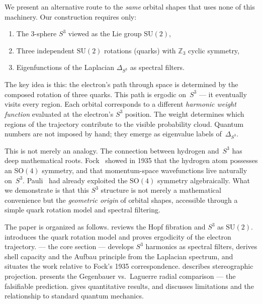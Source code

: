 \documentclass[12pt, a4paper]{article}
\theoremstyle{definition}
\theoremstyle{remark}
\newcommand{\Sthree}{S^3}
\newcommand{\SU}{\mathrm{SU}(2)}
\newcommand{\SO}{\mathrm{SO}}
\newcommand{\Z}{\mathbb{Z}}
\newcommand{\lap}{\Delta_{\Sthree}}
\begin{document}
We present an alternative route to the \emph{same} orbital shapes that uses
none of this machinery. Our construction requires only:
\begin{enumerate}[nosep]
  \item The 3-sphere $\Sthree$ viewed as the Lie group $\SU$,
  \item Three independent $\SU$ rotations (quarks) with $\Z_3$ cyclic symmetry,
  \item Eigenfunctions of the Laplacian $\lap$ as spectral filters.
\end{enumerate}

The key idea is this: the electron's path through space is determined by the
composed rotation of three quarks. This path is ergodic on~$\Sthree$ ---
it eventually visits every region. Each orbital corresponds to a different
\emph{harmonic weight function} evaluated at the electron's $\Sthree$
position. The weight determines which regions of the trajectory contribute
to the visible probability cloud. Quantum numbers are not imposed by hand;
they emerge as eigenvalue labels of~$\lap$.

This is not merely an analogy. The connection between hydrogen and~$\Sthree$
has deep mathematical roots. Fock~\cite{fock1935} showed in 1935 that the
hydrogen atom possesses an $\SO(4)$ symmetry, and that momentum-space
wavefunctions live naturally on~$\Sthree$. Pauli~\cite{pauli1926} had
already exploited the $\SO(4)$ symmetry algebraically. What we demonstrate
is that this $\Sthree$ structure is not merely a mathematical convenience
but the \emph{geometric origin} of orbital shapes, accessible through a
simple quark rotation model and spectral filtering.

The paper is organized as follows.  reviews the Hopf
fibration and $\Sthree$ as $\SU$.  introduces the quark
rotation model and proves ergodicity of the electron trajectory.
 --- the core section --- develops $\Sthree$ harmonics
as spectral filters, derives shell capacity and the Aufbau principle from
the Laplacian spectrum, and situates the work relative to Fock's 1935
correspondence.  describes stereographic projection.
 presents the Gegenbauer vs.\ Laguerre radial comparison
--- the falsifiable prediction.  gives quantitative
results, and  discusses limitations and the
relationship to standard quantum mechanics.


\end{document}
